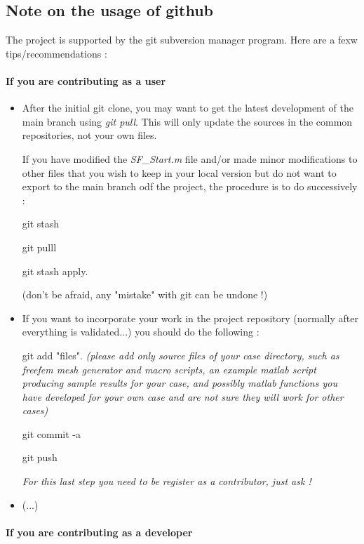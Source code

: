 \subsection{Note on the usage of github}
  
The project is supported by the git subversion manager program. Here are a fexw tips/recommendations :

\paragraph{If you are contributing as a user}

\begin {itemize}

\item After the initial git clone, you may want to get the latest development of the main branch using {\em git pull}. This will only update the sources in the common repositories, not your own files. 

If you have modified the {\em SF\_Start.m} file and/or made minor modifications to other files that you wish to keep in your local version but do not want to export to the main branch odf the project, the procedure is to do successively :

git stash

git pulll

git stash apply.

(don't be afraid, any "mistake" with git can be undone !) 

\item 
If you want to incorporate your work in the project repository (normally after everything is validated...) you should do the following :

git add "files".  {\em (please add only source files of your case directory, such as freefem mesh generator and macro scripts, an example matlab script producing sample results for your case, and possibly matlab functions you have developed for your own case and are not sure they will work for other cases)}


git commit -a

git push

{\em For this last step you need to be register as a contributor, just ask !}




\item (...)

\end{itemize}


\paragraph{If you are contributing as a developer}


